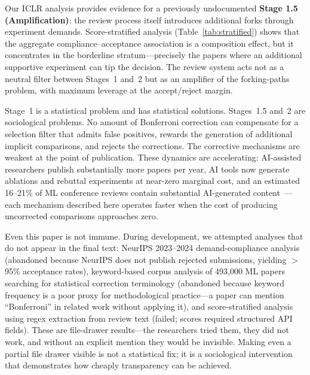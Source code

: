 \documentclass{article}
\begin{document}
Our ICLR analysis provides evidence for a previously undocumented \textbf{Stage 1.5 (Amplification)}: the review process itself introduces additional forks through experiment demands. Score-stratified analysis (Table~\ref{tab:stratified}) shows that the aggregate compliance--acceptance association is a composition effect, but it concentrates in the borderline stratum---precisely the papers where an additional supportive experiment can tip the decision. The review system acts not as a neutral filter between Stages~1 and~2 but as an amplifier of the forking-paths problem, with maximum leverage at the accept/reject margin.

Stage~1 is a statistical problem and has statistical solutions. Stages~1.5 and~2 are sociological problems. No amount of Bonferroni correction can compensate for a selection filter that admits false positives, rewards the generation of additional implicit comparisons, and rejects the corrections. The corrective mechanisms are weakest at the point of publication. These dynamics are accelerating: AI-assisted researchers publish substantially more papers per year, AI tools now generate ablations and rebuttal experiments at near-zero marginal cost, and an estimated 16--21\% of ML conference reviews contain substantial AI-generated content~\citep{liang_monitoring_2024}---each mechanism described here operates faster when the cost of producing uncorrected comparisons approaches zero.

Even this paper is not immune. During development, we attempted analyses that do not appear in the final text: NeurIPS 2023--2024 demand-compliance analysis (abandoned because NeurIPS does not publish rejected submissions, yielding $>$95\% acceptance rates), keyword-based corpus analysis of 493,000 ML papers searching for statistical correction terminology (abandoned because keyword frequency is a poor proxy for methodological practice---a paper can mention ``Bonferroni'' in related work without applying it), and score-stratified analysis using regex extraction from review text (failed; scores required structured API fields). These are file-drawer results---the researchers tried them, they did not work, and without an explicit mention they would be invisible. Making even a partial file drawer visible is not a statistical fix; it is a sociological intervention that demonstrates how cheaply transparency can be achieved.

\end{document}
